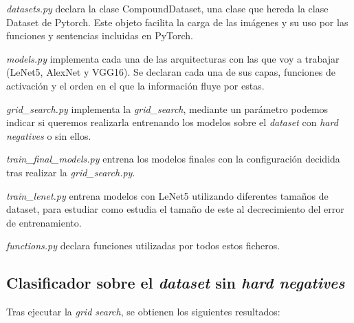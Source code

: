 \noindent \textit{datasets.py} declara la clase CompoundDataset, una clase que hereda la clase Dataset de Pytorch. Este objeto facilita la carga de las imágenes y su uso por las funciones y sentencias incluidas en PyTorch.

\noindent \textit{models.py} implementa cada una de las arquitecturas con las que voy a trabajar (LeNet5, AlexNet y VGG16). Se declaran cada una de sus capas, funciones de activación y el orden en el que la información fluye por estas.

\noindent \textit{grid\_search.py} implementa la \textit{grid\_search}, mediante un parámetro podemos indicar si queremos realizarla entrenando los modelos sobre el \textit{dataset} con \textit{hard negatives} o sin ellos.

\noindent \textit{train\_final\_models.py} entrena los modelos finales con la configuración decidida tras realizar la \textit{grid\_search.py}.

\noindent \textit{train\_lenet.py} entrena modelos con LeNet5 utilizando diferentes tamaños de dataset, para estudiar como estudia el tamaño de este al decrecimiento del error de entrenamiento.

\noindent \textit{functions.py} declara funciones utilizadas por todos estos ficheros.

\newpage
\subsection{Clasificador sobre el \textit{dataset} sin \textit{hard negatives}}
Tras ejecutar la \textit{grid search}, se obtienen los siguientes resultados:


